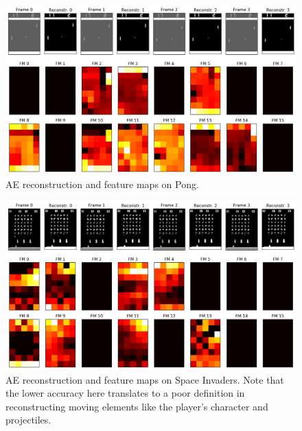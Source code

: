 %
%
\begin{figure}
    \includegraphics[width=\textwidth]{pictures/experiments/reconstr_pong}
    \centering
    \caption[AE reconstruction and feature maps on Pong]{AE reconstruction 
	    and feature maps on Pong.}
    \label{f:P_reconstr}
\end{figure}
%
%
\begin{figure}
    \includegraphics[width=\textwidth]{pictures/experiments/reconstr_space_invaders}
    \centering
    \caption[AE reconstruction and feature maps on Space Invaders]{AE 
	    reconstruction and feature maps on Space Invaders. Note that the 
	    lower accuracy here translates to a poor definition in 
	    reconstructing moving elements like the player's character and 
	    projectiles.}
    \label{f:SI_reconstr}
\end{figure}
%

